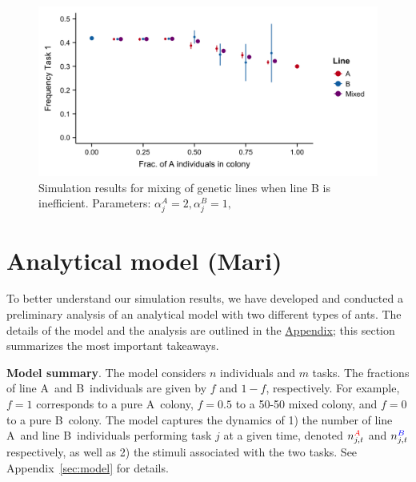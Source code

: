 \documentclass[11pt]{article}
\newcommand{\A}{{\color{red}A}}
\newcommand{\B}{{\color{blue}B}}
\begin{document}
\begin{figure}[H]
    \centering
    \includegraphics[trim={0 0.25in 0 0.2in}, clip, width=0.9\linewidth]{Mix_Alphas_B-inefficient_Means.png}
    \caption{Simulation results for mixing of genetic lines when line B is inefficient. Parameters: $\alpha_j^A = 2, \alpha_j^B = 1,$}
    \label{fig:Mix_Alphas_B-inefficient}
\end{figure}

\section{Analytical model (Mari)}

To better understand our simulation results, we have developed and conducted a preliminary analysis of an analytical model with two different types of ants.  The details of the model and the analysis are outlined in the \hyperref[sec:appendix]{Appendix}; this section summarizes the most important takeaways.

\textbf{Model summary}. The model considers $n$ individuals and $m$ tasks. The fractions of line \A\ and \B\ individuals are given by $f$ and $1-f$, respectively. For example, $f=1$ corresponds to a pure \A\ colony, $f = 0.5$ to a 50-50 mixed colony, and $f = 0$ to a pure \B\ colony. 
The model captures the dynamics of 1) the number of line \A\ and line \B\ individuals performing task $j$ at a given time, denoted $n_{j,t}^{\A}$ and $n_{j,t}^{\B}$ respectively, as well as 2) the stimuli associated with the two tasks. See Appendix~\ref{sec:model} for details.
\end{document}
